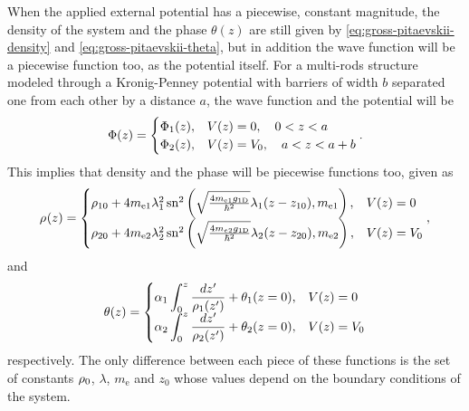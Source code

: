 When the applied external potential has a piecewise, constant magnitude, the
density of the system and the phase $\theta(z)$ are still given by
\eqref{eq:gross-pitaevskii-density} and \eqref{eq:gross-pitaevskii-theta}, but
in addition the wave function will be a piecewise function too, as the potential
itself. For a multi-rods structure modeled through a Kronig-Penney potential
with barriers of width $b$ separated one from each other by a distance $a$, the
wave function and the potential will be
%
\begin{align}
  \label{eq:gross-pitaevskii-kronig-penney-wavefunction}
  \gpwavefunc(z) = \begin{cases}
    \gpwavefunc_1(z), & V(z) = 0, \quad 0 < z < a       \\
    \gpwavefunc_2(z), & V(z) = V_0, \quad a < z < a + b
  \end{cases}.
\end{align}
%
This implies that density and the phase will be piecewise functions too, given
as
%
\begin{align}
  \label{eq:gross-pitaevskii-kronig-penney-density}
  \gprho(z) = \begin{cases}
    \gprho[10] + 4 m_{\mathrm{e}1} \lambda^2_{1} \, \jacobisn^2 \left( \sqrt{\frac{4 m_{\mathrm{e}1} \gonedim}{\hbar^2}} \lambda_{1} (z - z_{10}), m_{\mathrm{e}1}\right), & V(z) = 0   \\
    \gprho[20] + 4 m_{\mathrm{e}2} \lambda^2_{2} \, \jacobisn^2 \left( \sqrt{\frac{4 m_{e2} \gonedim}{\hbar^2}} \lambda_2 (z - z_{20}), m_{\mathrm{e}2}\right),            & V(z) = V_0
  \end{cases},
\end{align}
%
and
%
\begin{align}
  \label{eq:gross-pitaevskii-kronig-penney-theta}
  \theta(z) = \begin{cases}
    \displaystyle \alpha_{1} \int_{0}^{z} \frac{dz'}{\gprho[1](z')} + \theta_1(z=0), & V(z) = 0   \\
    \displaystyle \alpha_{2} \int_{0}^{z} \frac{dz'}{\gprho[2](z')} + \theta_2(z=0), & V(z) = V_0
  \end{cases}
\end{align}
%
respectively. The only difference between each piece of these functions is the
set of constants $\gprho[0]$, $\lambda$, $m_{\mathrm{e}}$ and $z_0$ whose values
depend on the boundary conditions of the system.

